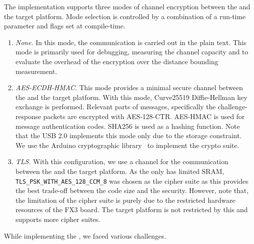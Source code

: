  The implementation supports three modes of channel encryption between the \device and the target platform. Mode selection is controlled by a combination of a run-time parameter and flags set at compile-time.

\begin{enumerate}
  \item \emph{None.} In this mode, the communication is carried out in the plain text. This mode is primarily used for debugging, measuring the channel capacity and to evaluate the overhead of the encryption over the distance bounding measurement.
  
  \item \emph{AES-ECDH-HMAC.} This mode provides a minimal secure channel between the \device and the target platform. With this mode, Curve25519 Diffie-Hellman key exchange is performed. Relevant parts of messages, specifically the challenge-response packets are encrypted with AES-128-CTR. AES-HMAC is used for message authentication codes. SHA256 is used as a hashing function. Note that the USB 2.0 implements this mode only due to the storage constraint. We use the Arduino cryptographic library~\cite{ardCrypto} to implement the crypto suite. 
  
  \item \emph{TLS.} With this configuration, we use a \tls channel for the communication between the \device and the target platform. As the \device only has limited SRAM, \texttt{TLS\_PSK\_WITH\_AES\_128\_CCM\_8} was chosen as the cipher suite as this provides the best trade-off between the code size and the security. However, note that, the limitation of the cipher suite is purely due to the restricted hardware resources of the FX3 board. The target platform is not restricted by this and supports more cipher suites. 
\end{enumerate}


  
 While implementing the \device, we faced various challenges.

